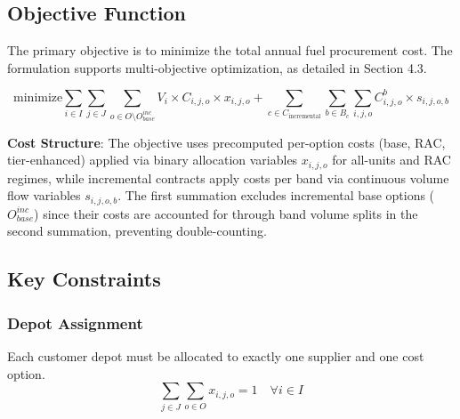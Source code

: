 \subsection{Objective Function}
The primary objective is to minimize the total annual fuel procurement cost. The formulation supports multi-objective optimization, as detailed in Section 4.3.

\begin{equation}
\text{minimize} \sum_{i\in I} \sum_{j\in J} \sum_{o\in O \setminus O^{inc}_{base}} V_i \times C_{i,j,o} \times x_{i,j,o} + \sum_{c\in C_{\text{incremental}}} \sum_{b\in B_c} \sum_{i,j,o} C_{i,j,o}^b \times s_{i,j,o,b}
\end{equation}

\textbf{Cost Structure}: The objective uses precomputed per-option costs (base, RAC, tier-enhanced) applied via binary allocation variables $x_{i,j,o}$ for all-units and RAC regimes, while incremental contracts apply costs per band via continuous volume flow variables $s_{i,j,o,b}$. The first summation excludes incremental base options ($O^{inc}_{base}$) since their costs are accounted for through band volume splits in the second summation, preventing double-counting.

\subsection{Key Constraints}
\subsubsection{Depot Assignment}
Each customer depot must be allocated to exactly one supplier and one cost option.
\begin{equation}
\sum_{j\in J} \sum_{o\in O} x_{i,j,o} = 1 \quad \forall i \in I
\end{equation}

